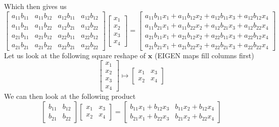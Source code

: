 \documentclass{article}
\begin{document}
\noindent Which then gives us
\begin{equation*}
    \begin{bmatrix}
    a_{11}b_{11} & a_{11}b_{12} & a_{12}b_{11} & a_{12}b_{12} \\
    a_{11}b_{21} & a_{11}b_{22} & a_{12}b_{21} & a_{12}b_{22} \\
    a_{21}b_{11} & a_{21}b_{12} & a_{22}b_{11} & a_{22}b_{12} \\
    a_{21}b_{21} & a_{21}b_{22} & a_{22}b_{21} & a_{22}b_{22} 
\end{bmatrix}\begin{bmatrix}
        x_{1} \\x_{2} \\x_{3} \\x_{4}
    \end{bmatrix} = \begin{bmatrix}
         a_{11}b_{11}x_{1} + a_{11}b_{12}x_{2} + a_{12}b_{11}x_{3} + a_{12}b_{12}x_{4} \\
         a_{11}b_{21}x_{1} + a_{11}b_{22}x_{2} + a_{12}b_{21}x_{3} + a_{12}b_{22}x_{4} \\
         a_{21}b_{11}x_{1} + a_{21}b_{12}x_{2} + a_{22}b_{11}x_{3} + a_{22}b_{12}x_{4} \\
         a_{21}b_{21}x_{1} + a_{21}b_{22}x_{2} + a_{22}b_{21}x_{3} + a_{22}b_{22}x_{4}
    \end{bmatrix}
\end{equation*}
Let us look at the following square reshape of $\mathbf{x}$ (EIGEN maps fill columns first)
\begin{equation*}
    \begin{bmatrix}
        x_{1} \\ x_{2} \\x_{3} \\x_{4}
    \end{bmatrix}
    \mapsto
    \begin{bmatrix}
        x_{1} & x_{3} \\
        x_{2} & x_{4}
    \end{bmatrix}
\end{equation*}
We can then look at the following product
\begin{equation*}
    \begin{bmatrix}
        b_{11} & b_{12} \\
        b_{21} & b_{22}
    \end{bmatrix}
    \begin{bmatrix}
        x_{1} & x_{3} \\
        x_{2} & x_{4}
    \end{bmatrix}
    = 
    \begin{bmatrix}
    b_{11}x_{1} + b_{12}x_{3} & b_{11}x_{2} + b_{12}x_{4} \\
    b_{21}x_{1} + b_{22}x_{3} & b_{21}x_{2} + b_{22}x_{4}
    \end{bmatrix}
\end{equation*}
\end{document}
